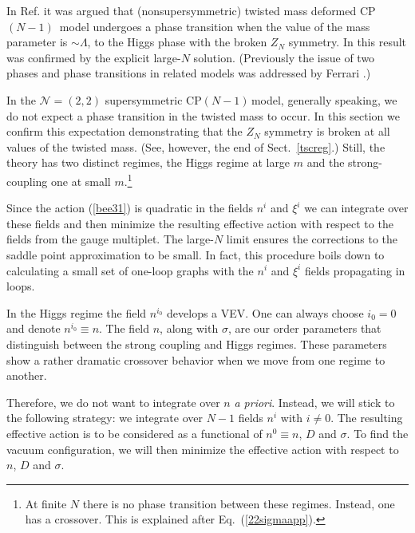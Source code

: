 \documentclass[epsfig,12pt]{article}
\newcommand{\cpn}{CP$(N-1)\,$}
\newcommand{\ntwot}{${\mathcal N}= \left(2,2\right) $ }
\begin{document}
In Ref. \cite{GSY05}
it was argued that (nonsupersymmetric) twisted mass deformed \mbox{\cpn} model
undergoes a phase transition when the value of the mass parameter is
$\sim \Lambda$, to the Higgs phase with the broken $Z_N$ symmetry.
 In \cite{GSYphtr} this result was confirmed by the explicit
 large-$N$ solution. (Previously
the issue of two phases and phase transitions in related models
was  addressed by Ferrari
\cite{Ferrari,Ferrari2}.)

In the \ntwot supersymmetric \cpn model, generally speaking,  we do not expect a phase transition
in the 
twisted mass to occur.  In this section we confirm this expectation demonstrating
that the $Z_N$ symmetry is  broken at all values of the twisted mass. 
(See, however, the end of Sect.~\ref{tscreg}.)
Still, the theory has two 
distinct regimes, the Higgs regime at large $m$ and the  strong-coupling one 
at small $m$.\footnote{At finite $N$ there is no phase transition between these regimes. Instead, one has a crossover. This is explained after Eq.~(\ref{22sigmaapp}).}

Since the action (\ref{bee31}) is quadratic in the fields $n^{i}$ and $\xi^i$
we can integrate over these fields and then minimize the resulting
effective action with respect to the  fields from the gauge multiplet. The large-$N$ limit ensures the corrections to the saddle point approximation to be  small. In fact,
this procedure boils down to calculating a small set of one-loop graphs with the
$n^{i}$ and $\xi^i$  fields propagating in loops.

In the Higgs regime the field $n^{i_0}$ develops a VEV.
One can always choose $i_0=0$ and denote $n^{i_0}\equiv n$. 
The field $n$, along with $\sigma$, are
our order parameters that distinguish between the
strong coupling  and Higgs regimes. These parameters show a rather dramatic crossover behavior
when we move from one regime to another.

Therefore, we do not want
to integrate over $n$ {\em a priori}. Instead,
we will stick to the following strategy:  we integrate over $N-1$
fields $n^{i}$ with $i \ne 0$.
The resulting effective action is to be considered as
a functional of $n^0\equiv n$, $D$ and
$\sigma$. To find the vacuum configuration, we will then minimize the
effective action with
respect to $n$, $D$ and
$\sigma$.
\end{document}
